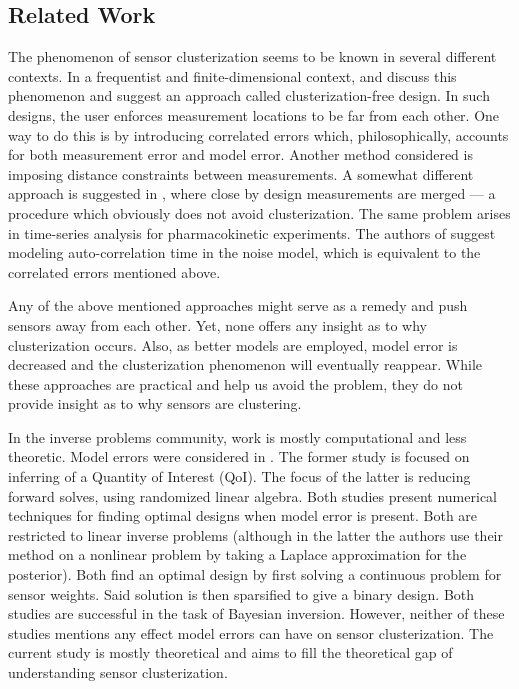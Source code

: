 \documentclass{amsart}
\numberwithin{equation}{section}
\begin{document}
\subsection{Related Work}
The phenomenon of sensor clusterization seems to be known in several
different contexts. In a frequentist and finite-dimensional context,
\cite{Fedorov96} and \cite[chapter 2.4.3]{Ucinski05} discuss this
phenomenon and suggest an approach called clusterization-free design.
In such designs, the user enforces measurement locations to be far
from each other. One way to do this is by introducing correlated
errors which, philosophically, accounts for both measurement error and
model error. Another method considered is imposing distance
constraints between measurements. A somewhat different approach is
suggested in \cite[page 49]{Fedorov12}, where close by design
measurements are merged --- a procedure which obviously does not avoid
clusterization. The same problem arises in time-series analysis for
pharmacokinetic experiments. The authors of \cite{Hooker09} suggest
modeling auto-correlation time in the noise model, which is equivalent
to the correlated errors mentioned above.

Any of the above mentioned approaches might serve as a remedy and push
sensors away from each other. Yet, none offers any insight as to why
clusterization occurs. Also, as better models are employed, model
error is decreased and the clusterization phenomenon will eventually
reappear. While these approaches are practical and help us avoid the
problem, they do not provide insight as to why sensors are clustering.

In the inverse problems community, work is mostly computational and
less theoretic. Model errors were considered in \cite{Attia20,
  Koval20}. The former study is focused on inferring of a Quantity of
Interest (QoI). The focus of the latter is reducing forward solves,
using randomized linear algebra. Both studies present numerical
techniques for finding optimal designs when model error is
present. Both are restricted to linear inverse problems (although in
the latter the authors use their method on a nonlinear problem by
taking a Laplace approximation for the posterior). Both find an
optimal design by first solving a continuous problem for sensor
weights. Said solution is then sparsified to give a binary
design. Both studies are successful in the task of Bayesian
inversion. However, neither of these studies mentions any effect model
errors can have on sensor clusterization. The current study is mostly
theoretical and aims to fill the theoretical gap of understanding
sensor clusterization.
\end{document}
